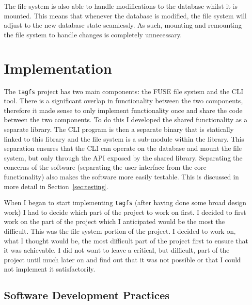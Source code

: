 The file system is also able to handle modifications to the database whilst it
is mounted. This means that whenever the database is modified, the file system
will adjust to the new database state seamlessly. As such, mounting and
remounting the file system to handle changes is completely unnecessary.

\section{Implementation}

The \texttt{tagfs} project has two main components: the FUSE file system and
the CLI tool. There is a significant overlap in functionality between the two
components, therefore it made sense to only implement functionality once and
share the code between the two components. To do this I developed the shared
functionality as a separate library.
The CLI program is then a separate binary that is statically linked to this
library and the file system is a sub-module within the library. This separation
ensures that the CLI can operate on the database and mount the file system, but
only through the API exposed by the shared library. Separating the concerns of
the software (separating the user interface from the core functionality) also
makes the software more easily testable. This is discussed in more detail in
Section~\ref{sec:testing}.

When I began to start implementing \texttt{tagfs} (after having done some broad
design work) I had to decide which part of the project to work on first. I
decided to first work on the part of the project which I anticipated would be
the most the difficult. This was the file system portion of the project. I
decided to work on, what I thought would be, the most difficult part of the
project first to ensure that it was achievable. I did not want to leave a
critical, but difficult, part of the project until much later on and find out
that it was not possible or that I could not implement it satisfactorily.

\subsection{Software Development Practices}


